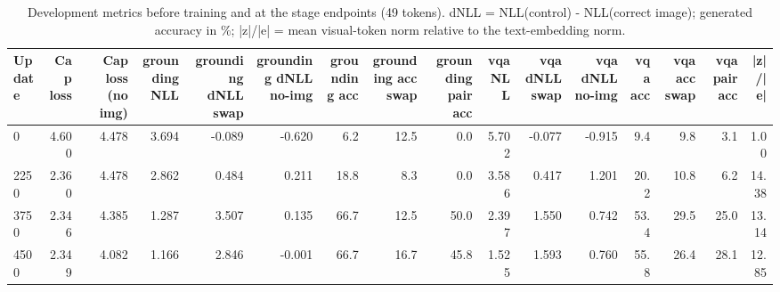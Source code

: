\begin{table}[t]
\centering
\small
\caption{Development metrics before training and at the stage endpoints (49 tokens). dNLL = NLL(control) - NLL(correct image); generated accuracy in \%; |z|/|e| = mean visual-token norm relative to the text-embedding norm.}
\label{tab:t2_t5_dev_by_stage_compress49}
\begin{tabular}{lrrrrrrrrrrrrrrr}
\toprule
Update & Cap loss & Cap loss (no img) & grounding NLL & grounding dNLL swap & grounding dNLL no-img & grounding acc & grounding acc swap & grounding pair acc & vqa NLL & vqa dNLL swap & vqa dNLL no-img & vqa acc & vqa acc swap & vqa pair acc & |z|/|e| \\
\midrule
0 & 4.600 & 4.478 & 3.694 & -0.089 & -0.620 & 6.2 & 12.5 & 0.0 & 5.702 & -0.077 & -0.915 & 9.4 & 9.8 & 3.1 & 1.00 \\
2250 & 2.360 & 4.478 & 2.862 & 0.484 & 0.211 & 18.8 & 8.3 & 0.0 & 3.586 & 0.417 & 1.201 & 20.2 & 10.8 & 6.2 & 14.38 \\
3750 & 2.346 & 4.385 & 1.287 & 3.507 & 0.135 & 66.7 & 12.5 & 50.0 & 2.397 & 1.550 & 0.742 & 53.4 & 29.5 & 25.0 & 13.14 \\
4500 & 2.349 & 4.082 & 1.166 & 2.846 & -0.001 & 66.7 & 16.7 & 45.8 & 1.525 & 1.593 & 0.760 & 55.8 & 26.4 & 28.1 & 12.85 \\
\bottomrule
\end{tabular}
\end{table}
